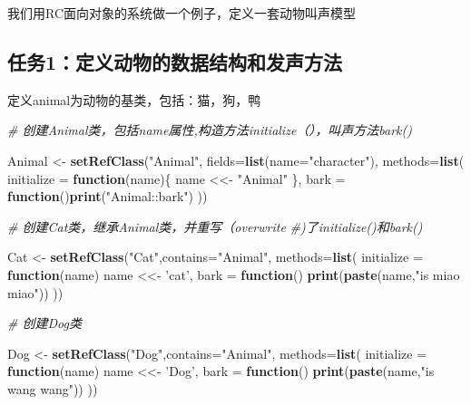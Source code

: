 \documentclass[]{book}
\newenvironment{Shaded}{\begin{snugshade}}{\end{snugshade}}
\newcommand{\KeywordTok}[1]{\textcolor[rgb]{0.13,0.29,0.53}{\textbf{#1}}}
\newcommand{\DataTypeTok}[1]{\textcolor[rgb]{0.13,0.29,0.53}{#1}}
\newcommand{\StringTok}[1]{\textcolor[rgb]{0.31,0.60,0.02}{#1}}
\newcommand{\CommentTok}[1]{\textcolor[rgb]{0.56,0.35,0.01}{\textit{#1}}}
\newcommand{\ControlFlowTok}[1]{\textcolor[rgb]{0.13,0.29,0.53}{\textbf{#1}}}
\newcommand{\NormalTok}[1]{#1}
\begin{document}
我们用RC面向对象的系统做一个例子，定义一套动物叫声模型

\subsection{任务1：定义动物的数据结构和发声方法}\label{1}

定义animal为动物的基类，包括：猫，狗，鸭

\begin{Shaded}
\begin{Highlighting}[]
\CommentTok{# 创建Animal类，包括name属性,构造方法initialize（），叫声方法bark()}

\NormalTok{Animal <-}\StringTok{ }\KeywordTok{setRefClass}\NormalTok{(}\StringTok{"Animal"}\NormalTok{,}
                      \DataTypeTok{fields=}\KeywordTok{list}\NormalTok{(}\DataTypeTok{name=}\StringTok{"character"}\NormalTok{),}
                      \DataTypeTok{methods=}\KeywordTok{list}\NormalTok{(}
                        \DataTypeTok{initialize =} \ControlFlowTok{function}\NormalTok{(name)\{}
\NormalTok{                          name <<-}\StringTok{ "Animal"}
\NormalTok{                        \},}
                        \DataTypeTok{bark =} \ControlFlowTok{function}\NormalTok{()}\KeywordTok{print}\NormalTok{(}\StringTok{"Animal::bark"}\NormalTok{)}
\NormalTok{                      ))}

\CommentTok{# 创建Cat类，继承Animal类，并重写（overwrite}
\CommentTok{#)了initialize()和bark()}

\NormalTok{Cat <-}\StringTok{ }\KeywordTok{setRefClass}\NormalTok{(}\StringTok{"Cat"}\NormalTok{,}\DataTypeTok{contains=}\StringTok{"Animal"}\NormalTok{,}
                   \DataTypeTok{methods=}\KeywordTok{list}\NormalTok{(}
                     \DataTypeTok{initialize =} \ControlFlowTok{function}\NormalTok{(name) name <<-}\StringTok{ 'cat'}\NormalTok{,}
                     \DataTypeTok{bark =} \ControlFlowTok{function}\NormalTok{() }\KeywordTok{print}\NormalTok{(}\KeywordTok{paste}\NormalTok{(name,}\StringTok{"is miao miao"}\NormalTok{))}
\NormalTok{                   ))}

\CommentTok{# 创建Dog类}


\NormalTok{Dog <-}\StringTok{ }\KeywordTok{setRefClass}\NormalTok{(}\StringTok{"Dog"}\NormalTok{,}\DataTypeTok{contains=}\StringTok{"Animal"}\NormalTok{,}
                   \DataTypeTok{methods=}\KeywordTok{list}\NormalTok{(}
                     \DataTypeTok{initialize =} \ControlFlowTok{function}\NormalTok{(name) name <<-}\StringTok{ 'Dog'}\NormalTok{,}
                     \DataTypeTok{bark =} \ControlFlowTok{function}\NormalTok{() }\KeywordTok{print}\NormalTok{(}\KeywordTok{paste}\NormalTok{(name,}\StringTok{"is wang wang"}\NormalTok{))}
\NormalTok{                   ))}


\end{Highlighting}
\end{Shaded}
\end{document}
